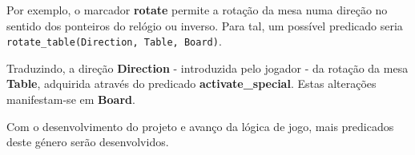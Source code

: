\documentclass[a4paper]{article}
\begin{document}
Por exemplo, o marcador \textbf{rotate} permite a rotação da mesa numa direção no sentido dos ponteiros do relógio ou inverso. Para tal, um possível predicado seria \texttt{rotate\_table(Direction, Table, Board)}. 	\newline

Traduzindo, a direção \textbf{Direction} - introduzida pelo jogador - da rotação da mesa \textbf{Table}, adquirida através do predicado \textbf{activate\_special}. Estas alterações manifestam-se em \textbf{Board}. \newline

Com o desenvolvimento do projeto e avanço da lógica de jogo, mais predicados deste género serão desenvolvidos.
\end{document}
